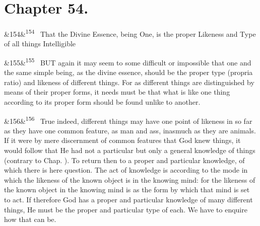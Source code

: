 \documentclass[12pt]{article}
\newcommand{\para}[1][]{\par\noindent\ifx&#1&\else\textsuperscript{\footnotesize #1}~\fi}
\begin{document}
\section*{Chapter 54. }

\para[154] That the Divine Essence, being One, is the proper Likeness and Type of all things Intelligible

\para[155] BUT again it may seem to some difficult or impossible that one and the same simple being, as the divine essence, should be the proper type (propria ratio) and likeness of different things. For as different things are distinguished by means of their proper forms, it needs must be that what is like one thing according to its proper form should be found unlike to another.

\para[156] True indeed, different things may have one point of likeness in so far as they have one common feature, as man and ass, inasmuch as they are animals. If it were by mere discernment of common features that God knew things, it would follow that He had not a particular but only a general knowledge of things (contrary to Chap. ). To return then to a proper and particular knowledge, of which there is here question. The act of knowledge is according to the mode in which the likeness of the known object is in the knowing mind: for the likeness of the known object in the knowing mind is as the form by which that mind is set to act. If therefore God has a proper and particular knowledge of many different things, He must be the proper and particular type of each. We have to enquire how that can be.
\end{document}
